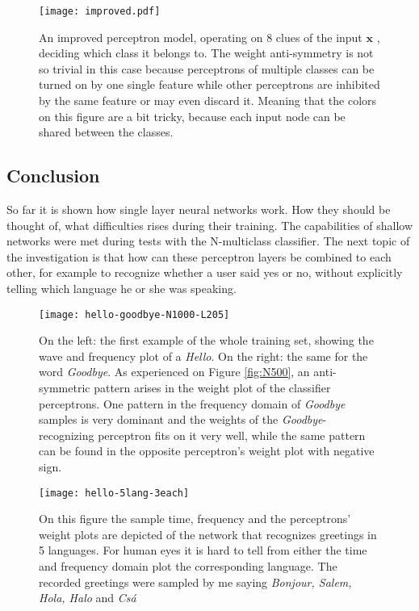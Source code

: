 \begin{figure}
	\centering
	\texttt{[image: improved.pdf]}
	\caption{An improved perceptron model, operating on 8 clues of the input $\mathbf{x}$ , deciding which class it belongs to. The weight anti-symmetry is not so trivial in this case because perceptrons of multiple classes can be turned on by one single feature while other perceptrons are inhibited by the same feature or may even discard it. Meaning that the colors on this figure are a bit tricky, because each input node can be shared between the classes.}
	
	\label{fig:improved}
\end{figure}

\subsection{Conclusion}
So far it is shown how single layer neural networks work. How they should be thought of, what difficulties rises during their training. The capabilities of shallow networks were met during tests with the N-multiclass classifier. The next topic of the investigation is that how can these perceptron layers be combined to each other, for example to recognize whether a user said yes or no, without explicitly telling  which language he or she was speaking.

\begin{figure}
	\centering
	\texttt{[image: hello-goodbye-N1000-L205]}
	\caption{On the left: the first example of the whole training set, showing the wave and frequency plot of a \emph{Hello}. On the right: the same for the word \emph{Goodbye}. As experienced on Figure \ref{fig:N500}, an anti-symmetric pattern arises in the weight plot of the classifier perceptrons. One pattern in the frequency domain of \emph{Goodbye} samples is very dominant and the weights of the \emph{Goodbye}-recognizing perceptron fits on it very well, while the same pattern can be found in the opposite perceptron's weight plot with negative sign.}
	
	\label{fig:hello}
\end{figure}

\begin{figure}
	\centering
	\texttt{[image: hello-5lang-3each]}
	\caption{On this figure the sample time, frequency and the perceptrons' weight plots are depicted of the network that recognizes greetings in 5 languages. For human eyes it is hard to tell from either the time and frequency domain plot the corresponding language. The recorded greetings were sampled by me saying \emph{Bonjour, Salem, Hola, Halo} and \emph{Csá}}
	
	\label{fig:hello5}
\end{figure}
